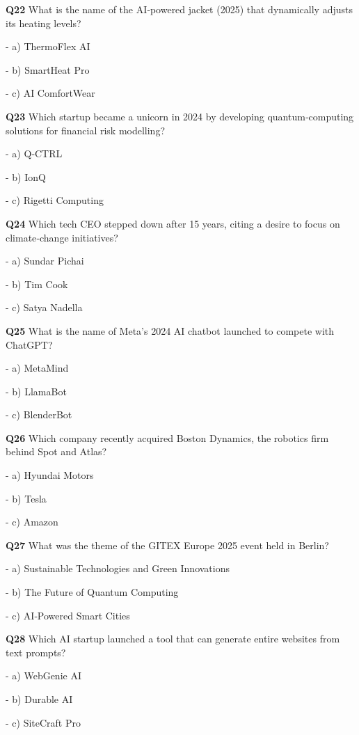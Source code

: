 \textbf{Q22} What is the name of the AI‑powered jacket (2025) that dynamically adjusts its heating levels?\par
\quad - a) ThermoFlex AI\par
\quad - b) SmartHeat Pro\par
\quad - c) AI ComfortWear\par

\textbf{Q23} Which startup became a unicorn in 2024 by developing quantum‑computing solutions for financial risk modelling?\par
\quad - a) Q‑CTRL\par
\quad - b) IonQ\par
\quad - c) Rigetti Computing\par

\textbf{Q24} Which tech CEO stepped down after 15 years, citing a desire to focus on climate‑change initiatives?\par
\quad - a) Sundar Pichai\par
\quad - b) Tim Cook\par
\quad - c) Satya Nadella\par

\textbf{Q25} What is the name of Meta's 2024 AI chatbot launched to compete with ChatGPT?\par
\quad - a) MetaMind\par
\quad - b) LlamaBot\par
\quad - c) BlenderBot\par

\textbf{Q26} Which company recently acquired Boston Dynamics, the robotics firm behind Spot and Atlas?\par
\quad - a) Hyundai Motors\par
\quad - b) Tesla\par
\quad - c) Amazon\par

\textbf{Q27} What was the theme of the GITEX Europe 2025 event held in Berlin?\par
\quad - a) Sustainable Technologies and Green Innovations\par
\quad - b) The Future of Quantum Computing\par
\quad - c) AI‑Powered Smart Cities\par

\textbf{Q28} Which AI startup launched a tool that can generate entire websites from text prompts?\par
\quad - a) WebGenie AI\par
\quad - b) Durable AI\par
\quad - c) SiteCraft Pro\par

